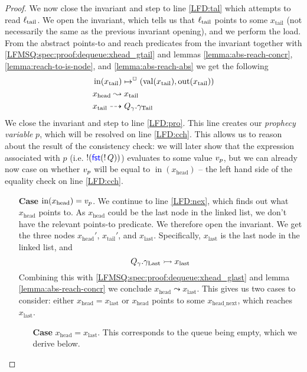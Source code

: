 \documentclass[a4paper, 10pt]{report}
\theoremstyle{definition}
\newcommand{\locN}[1]{\loc_{\mathrm{#1}}}
\newcommand{\loctail}{\locN{tail}}
\newcommand{\nIn}[1]{\operatorname{in}(#1)}
\newcommand{\nVal}[1]{\operatorname{val}(#1)}
\newcommand{\nOut}[1]{\operatorname{out}(#1)}
\newcommand{\node}{x}
\newcommand{\nodeN}[1]{\node_{\mathrm{#1}}}
\newcommand{\nodehead}{\nodeN{head}}
\newcommand{\nodetail}{\nodeN{tail}}
\newcommand{\nodelast}{\nodeN{last}}
\newcommand{\nodeheadnext}{\nodeN{head\_next}}
\newcommand{\prophval}{\val_p}
\newcommand{\Qg}{Q_\gname}
\newcommand{\gtail}{\gname_{\mathrm{Tail}}}
\newcommand{\glast}{\gname_{\mathrm{Last}}}
\newcommand{\isNode}[1]{\nIn{#1} \mapsto^{\persistently} (\nVal{#1}, \nOut{#1})}
\newcommand{\reach}[2]{#1 \leadsto #2}
\newcommand{\ar}[2]{#1 \dashrightarrow #2}
\newcommand{\ap}[2]{#1 \rightarrowtail #2}
\begin{document}
\begin{proof}
  We now close the invariant and step to line \ref{LFD:tal} which attempts to read $\loctail$. We open the invariant, which tells us that $\loctail$ points to some $\nodetail$ (not necessarily the same as the previous invariant opening), and we perform the load. From the abstract points-to and reach predicates from the invariant together with \ref{LFMSQ:spec:proof:dequeue:xhead_gtail} and lemmas \ref{lemma:abs-reach-concr}, \ref{lemma:reach-to-is-node}, and \ref{lemma:abs-reach-abs} we get the following
  \begin{align}
    &\isNode{\nodetail}\label{LFMSQ:spec:proof:dequeue:xtail_node}\\
    &\reach{\nodehead}{\nodetail}\label{LFMSQ:spec:proof:dequeue:xhead_r_xtail}\\
    &\ar{\nodetail}{\Qg.\gtail}\label{LFMSQ:spec:proof:dequeue:xtail_gtail}\\
  \end{align}
  We close the invariant and step to line \ref{LFD:pro}. This line creates our \textit{prophecy variable} $p$, which will be resolved on line \ref{LFD:cch}. This allows us to reason about the result of the consistency check: we will later show that the expression associated with $p$ (i.e. $\mathop{!}(\operatorname{\textsf{\color{blue} fst}} (\mathop{!} Q))$) evaluates to some value $\prophval$, but we can already now case on whether $\prophval$ will be equal to $\nIn{\nodehead}$ -- the left hand side of the equality check on line \ref{LFD:cch}.
  \begin{itemize}
    \item[\textbf{Case}] $\nIn{\nodehead} = \prophval$.
    We continue to line \ref{LFD:nex}, which finds out what $\nodehead$ points to. As $\nodehead$ could be the last node in the linked list, we don't have the relevant points-to predicate. We therefore open the invariant. We get the three nodes $\nodehead'$, $\nodetail'$, and $\nodelast$. Specifically, $\nodelast$ is the last node in the linked list, and 
    \begin{equation}\label{LFMSQ:spec:proof:dequeue:glast_xlast}
      \ap{\Qg.\glast}{\nodelast}
    \end{equation}
    Combining this with \ref{LFMSQ:spec:proof:dequeue:xhead_glast} and lemma \ref{lemma:abs-reach-concr} we conclude $\reach{\nodehead}{\nodelast}$. This gives us two cases to consider: either $\nodehead = \nodelast$ or $\nodehead$ points to some $\nodeheadnext$, which reaches $\nodelast$.
    \begin{itemize}
      \item[\textbf{Case}] $\nodehead = \nodelast$. This corresponds to the queue being empty, which we derive below.\\

\end{itemize}
\end{itemize}
\end{proof}
\end{document}
